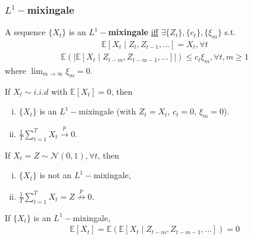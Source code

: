 \documentclass[11pt]{elegantbook}
\begin{document}
\subsubsection*{$L^1-$mixingale}
\begin{definition}[$L^1-$mixingale]\label{def:mixingale}
    A sequence $\{X_t\}$ is an \textbf{$L^1-$mixingale} \underline{iff} $\exists\{Z_t\},\{c_t\},\{\xi_m\}$ s.t.
    \begin{equation}
        \begin{aligned}
            \mathbb{E}[X_t\mid Z_t,Z_{t-1},...]=X_t,\forall t
        \end{aligned}
        \label{def:mixingale_1}
    \end{equation}
    \begin{equation}
        \begin{aligned}
            \mathbb{E}\left(|\mathbb{E}[X_t\mid Z_{t-m},Z_{t-m-1},...]|\right)\leq c_t\xi_m,\forall t,m\geq 1
        \end{aligned}
        \label{def:mixingale_2}
    \end{equation}
    where $\lim_{m \rightarrow \infty}\xi_m =0$.
\end{definition}
\begin{lemma}
    If $X_t\sim i.i.d$ with $\mathbb{E}[X_t]=0$, then
    \begin{enumerate}[(i).]
        \item $\{X_t\}$ is an $L^1-$mixingale (with $Z_t=X_t$, $c_t=0$, $\xi_m=0$).
        \item $\frac{1}{T}\sum_{t=1}^T X_t \stackrel{p}{\longrightarrow} 0$.
    \end{enumerate}
    If $X_t=Z\sim \mathcal{N}(0,1),\forall t$, then
    \begin{enumerate}[(i).]
        \item $\{X_t\}$ is not an $L^1-$mixingale,
        \item $\frac{1}{T}\sum_{t=1}^T X_t = Z \stackrel{p}{\nrightarrow} 0$.
    \end{enumerate}
    If $\{X_t\}$ is an $L^1-$mixingale,
    \begin{equation}
        \begin{aligned}
            \mathbb{E}[X_t]=\mathbb{E}\left(\mathbb{E}[X_t\mid Z_{t-m},Z_{t-m-1},...]\right)=0
        \end{aligned}
        \nonumber
    \end{equation}
\end{lemma}
\end{document}
